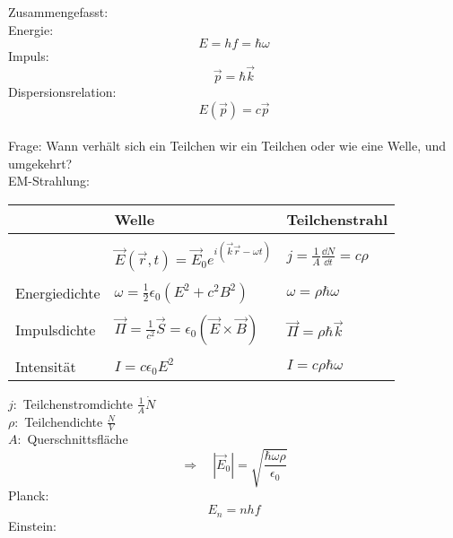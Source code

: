 Zusammengefasst:\\
Energie:
\begin{equation*}
E = h f = \hbar \omega      %
\end{equation*}
Impuls:
\begin{equation*}
\vec{p} = \hbar \vec{k}
\end{equation*}
Dispersionsrelation:
\begin{equation*}
E(\vec{p}) = c \vec{p}
\end{equation*}
\\[5pt]
Frage: Wann verhält sich ein Teilchen wir ein Teilchen oder wie eine Welle, und umgekehrt?\\[5pt]
EM-Strahlung:
\begin{center}
	\begin{tabular}{l|l|l}
		& Welle & Teilchenstrahl\\
		\hline
	    & & \\[-5pt]
		& $ \displaystyle\vec{E}(\vec{r},t) = \displaystyle\vec{E}_0 e^{i(\vec{k} \vec{r} - \omega t)} $ & $ j = \displaystyle\frac{1}{A} \displaystyle\frac{\dd N}{\dd t} = c \rho $\\[7pt]
		\hline
		& & \\[-5pt]
		Energiedichte & $ \omega = \displaystyle\frac{1}{2} \epsilon_0 \left(E^2 + c^2 B^2\right) $ & $ \omega = \rho \hbar \omega $\\[7pt]
		\hline
		& & \\[-5pt]
		Impulsdichte & $ \vec{\Pi} =\displaystyle \frac{1}{c^2} \vec{S} = \epsilon_0 \left(\vec{E} \times \vec{B}\right) $ & $ \vec{\Pi} = \rho \hbar \vec{k} $\\[7pt]
		\hline
		& & \\[-5pt]
		Intensität & $ I = c \epsilon_0 E^2 $ & $ I = c \rho \hbar \omega $ \\[5pt]
	\end{tabular}
\end{center}
$ j : $ Teilchenstromdichte $ \frac{1}{A} \dot{N} $\\
$ \rho : $ Teilchendichte $ \frac{N}{V} $\\
$ A : $ Querschnittsfläche
\begin{equation*}
\Rightarrow \quad |\vec{E}_0| = \sqrt{\frac{\hbar \omega \rho}{\epsilon_0}}
\end{equation*}
Planck:
\begin{equation*}
E_n = n h f
\end{equation*}
Einstein:\\
